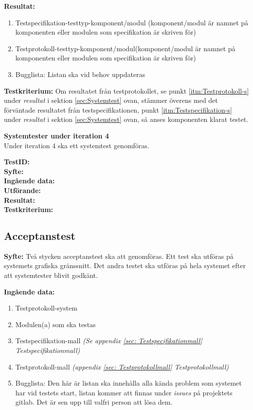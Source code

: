 \documentclass[a4paper,10pt, twoside]{article}
\begin{document}
\textbf{Resultat:}
    \begin{enumerate}
        \item \label{itm:Testspecifikation-s}
         Testspecifikation-testtyp-komponent/modul (komponent/modul är namnet på komponenten eller modulen som specifikation är skriven för)
        \item \label{itm:Testprotokoll-s} Testprotokoll-testtyp-komponent/modul(komponent/modul är namnet på komponenten eller modulen som specifikation är      		 skriven för)
        \item Bugglista: Listan ska vid behov uppdateras
    \end{enumerate}

\textbf{Testkriterium:} Om resultatet från testprotokollet, se punkt
\ref{itm:Testprotokoll-s} under \emph{resultat} i sektion \ref{sec:Systemtest}
ovan, stämmer överens med det förväntade resultatet från testspecifikationen,
punkt \ref{itm:Testspecifikation-s} under \emph{resultat} i sektion
\ref{sec:Systemtest} ovan, så anses komponenten klarat testet.

\textbf{Systemtester under iteration 4}
\\ Under iteration 4 ska ett systemtest genomföras.

   \textbf{TestID:}
\\ \textbf{Syfte:}
\\ \textbf{Ingående data:}
\\ \textbf{Utförande:}
\\ \textbf{Resultat:}
\\ \textbf{Testkriterium:}

\subsection{Acceptanstest}
\textbf{Syfte:} Två stycken acceptanstest ska att genomföras. Ett test ska utföras på systemets grafiska gränssnitt.  Det andra testet ska utföras på hela systemet efter att systemtester blivit godkänt.

\textbf{Ingående data:}
\begin{enumerate}
	\item Testprotokoll-system
    \item Modulen(a) som ska testas
    \item Testspecifikation-mall \emph{(Se appendix \ref{sec: Testspecifikationmall} Testspecifikationmall)}
    \item Testprotokoll-mall \emph{(appendix \ref{sec: Testprotokollmall} Testprotokollmall)}
    \item Bugglista: Den här är listan ska innehålla alla kända problem som systemet har vid testets start, listan kommer att finnas under
    \emph{issues} på projektets gitlab. Det är sen upp till valfri person att lösa dem.
\end{enumerate}
\end{document}
